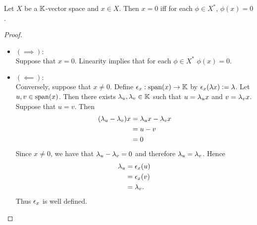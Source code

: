 \documentclass{book}
\begin{document}
\begin{ex}
	
\end{ex}


\begin{ex}
	Let $X$ be a $\mathbb{K}$-vector space and $x \in X$. Then $x = 0$ iff for each $\phi \in X^*$, $\phi(x) = 0$. 
\end{ex}

\begin{proof}\
	\begin{itemize}
		\item $(\implies):$ \\
		Suppose that $x = 0$. Linearity implies that for each $\phi \in X^*$ $\phi(x) = 0$. 
		\item $(\impliedby):$ \\
		Conversely, suppose that $x \neq 0$. Define $\epsilon_x: \operatorname{span}(x) \rightarrow \mathbb{K}$ by $\epsilon_x(\lambda x) \vcentcolon= \lambda$. Let $u,v \in \operatorname{span}(x)$. Then there exists $\lambda_u, \lambda_v \in \mathbb{K}$ such that $u = \lambda_u x$ and $v = \lambda_v x$. Suppose that $u = v$. Then 
		\begin{align*}
			(\lambda_u - \lambda_v)x
			& = \lambda_u x - \lambda_v x \\
			& = u - v \\
			& = 0
		\end{align*}
		Since $x \neq 0$, we have that $\lambda_u - \lambda_v = 0$ and therefore $\lambda_u = \lambda_v$. Hence  
		\begin{align*}
			\lambda_u 
			& = \epsilon_x(u) \\
			& = \epsilon_x(v) \\
			& = \lambda_v.
		\end{align*}
		Thus $\epsilon_x$ is well defined. 
	\end{itemize}
\end{proof}
\end{document}
